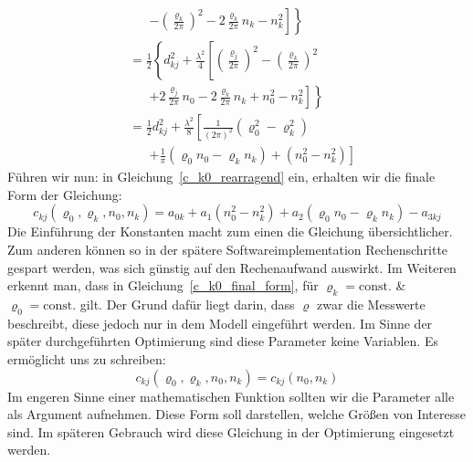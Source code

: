 {\begin{align}
	&\phantom{=}\; 
	\left.\left.-\left(\frac{\varrho_k}{2\pi}\right)^2-2\frac{\varrho_k}{2\pi}n_k-n_k^2\right]\right\}\\
%    
    &=\frac{1}{2}\left\{d_{kj}^2+\frac{\lambda^2}{4}\left[\left(\frac{\varrho_j}{2\pi}\right)^2-\left(\frac{\varrho_k}{2\pi}\right)^2 \right.\right.\nonumber\\
    &\phantom{=}\;
   	\left.\left.+2\frac{\varrho_j}{2\pi}n_0-2\frac{\varrho_k}{2\pi}n_k+n_0^2-n_k^2\right]\right\}\\
%	
	&=\frac{1}{2}d_{kj}^2+\frac{\lambda^2}{8}\left[\frac{1}{(2\pi)^2}\left(\varrho_0^2-\varrho_k^2\right) \right.\nonumber\\
	&\phantom{=}\;
	\left. +\frac{1}{\pi}\left(\varrho_0n_0-\varrho_kn_k\right)+\left(n_0^2-n_k^2\right)\right]\label{c_k0_rearragend}
\end{align}
%
Führen wir nun:
%
in Gleichung~\eqref{c_k0_rearragend} ein, erhalten wir die finale Form der Gleichung:
\begin{equation}
c_{kj}(\varrho_0, \varrho_k, n_0, n_k) = a_{0k}+a_1(n_0^2-n_k^2)+a_2(\varrho_0n_0-\varrho_kn_k)-a_{3kj}\label{c_k0_final_form}   
\end{equation}
%
Die Einführung der Konstanten macht zum einen die Gleichung übersichtlicher. Zum anderen können so in der spätere Softwareimplementation Rechenschritte gespart werden, was sich günstig auf den Rechenaufwand auswirkt. Im Weiteren erkennt man, dass in Gleichung~\eqref{c_k0_final_form}, für $\varrho_k=\text{const.}$ \& $\varrho_0=\text{const.}$ gilt. Der Grund dafür liegt darin, dass $\varrho$ zwar die Messwerte beschreibt, diese jedoch nur in dem Modell eingeführt werden. Im Sinne der später durchgeführten Optimierung sind diese Parameter keine Variablen. Es ermöglicht uns zu schreiben:
\begin{equation}
c_{kj}(\varrho_0, \varrho_k, n_0, n_k) = c_{kj}(n_0, n_k)
\end{equation}
%
Im engeren Sinne einer mathematischen Funktion sollten wir die Parameter alle als Argument aufnehmen. Diese Form soll darstellen, welche Größen von Interesse sind. Im späteren Gebrauch wird diese Gleichung in der Optimierung eingesetzt werden.\\
}
